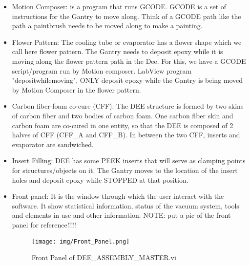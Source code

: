 \documentclass[12pt]{cornelltfpxsop}
\begin{document}
\begin{itemize}
    \item Motion Composer: is a program that runs GCODE. GCODE is a set of instructions for the Gantry to move along. Think of a GCODE path like the path a paintbrush needs to be moved along to make a painting.
    
    \item Flower Pattern: The cooling tube or evaporator has a flower shape which we call here flower pattern. The Gantry needs to deposit epoxy while it is moving along the flower pattern path in the Dee. For this, we have a GCODE script/program run by Motion composer. LabView program "depositwhilemoving", ONLY deposit epoxy while the Gantry is being moved by Motion Composer in the flower pattern.

    \item Carbon fiber-foam co-cure (CFF): The DEE structure is formed by two skins of carbon fiber and two bodies of carbon foam. One carbon fiber skin and carbon foam are co-cured in one entity, so that the DEE is composed of 2 halves of CFF (CFF\_A and CFF\_B). In between the two CFF, inserts and evaporator are sandwiched.    
    
    \item Insert Filling: DEE has some PEEK inserts that will serve as clamping points for structures/objects on it. The Gantry moves to the location of the insert holes and deposit epoxy while STOPPED at that position. 
    
    \item Front panel: It is the window through which the user interact with the software. It show statistical information, status of the vacuum system, tools and elements in use and other information.  NOTE: put a pic of the front panel for reference!!!!! 
    \begin{center}
\begin{figure}[h!]
\texttt{[image: img/Front\_Panel.png]}
\caption{Front Panel of DEE_ASSEMBLY_MASTER.vi}
\label{gantry_setup}
\end{figure}
\end{center}
\end{itemize}

\end{document}

